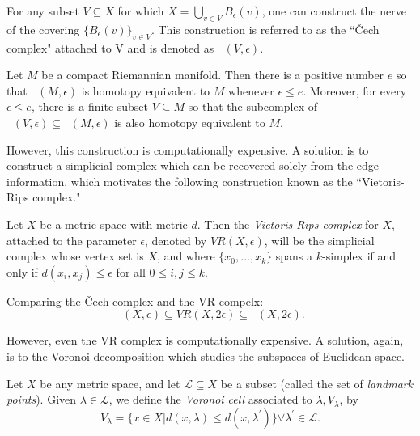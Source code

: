 \documentclass[11pt,reqno,oneside,a4paper]{article}
\DeclareMathOperator{\Cech}{\check{C}}
\begin{document}
\begin{defn}
	For any subset $V\subseteq X$ for which $X = \bigcup_{v\in V}B_\epsilon(v)$, one can construct the nerve of the covering $\{B_\epsilon(v)\}_{v\in V}$. This construction is referred to as the ``\v{C}ech complex" attached to V and is denoted as $\Cech(V,\epsilon)$.
\end{defn}

\begin{thm}
Let $M$ be a compact Riemannian manifold. Then there is a positive number $e$ so that $\Cech(M, \epsilon)$ is homotopy equivalent to $M$ whenever $\epsilon \leq e$. Moreover, for every $ \epsilon \leq e$, there is a finite subset $V \subseteq M$ so that the subcomplex of $\Cech(V,\epsilon) \subseteq \Cech(M, \epsilon)$ is also homotopy equivalent to $M$.
\end{thm}

However, this construction is computationally expensive. A solution is to construct a simplicial complex which can be recovered solely from the edge information, which motivates the following construction known as the ``Vietoris-Rips complex." 

\begin{defn}
	Let $X$ be a metric space with metric $d$. Then the  \textit{Vietoris-Rips complex} for $X$, attached to the parameter $\epsilon$, denoted by $VR(X,\epsilon)$, will be the simplicial complex whose vertex set is $X$, and where $\{x_0,\dots, x_k\}$ spans a $k$-simplex if and only if $d(x_i,x_j) \leq \epsilon$ for all $0\leq i,j\leq k.$
\end{defn}

\begin{prop}
	Comparing the \v{C}ech complex and the VR compelx:
	$$ \Cech(X,\epsilon) \subseteq VR (X,2\epsilon) \subseteq \Cech(X,2\epsilon).$$
\end{prop}

However, even the VR complex is computationally expensive. A solution, again, is to the Voronoi decomposition which studies the subspaces of Euclidean space. 

\begin{thm}
	Let $X$ be any metric space, and let $\mathcal{L}\subseteq X$ be a subset (called the set of \textit{landmark points}). Given $\lambda \in \mathcal{L}$, we define the \textit{Voronoi cell} associated to $\lambda, V_\lambda$, by
	$$V_\lambda = \{x\in X| d(x,\lambda) \leq d(x,\lambda^\prime)\} \forall \lambda^\prime \in \mathcal{L}.$$
\end{thm}
\end{document}
